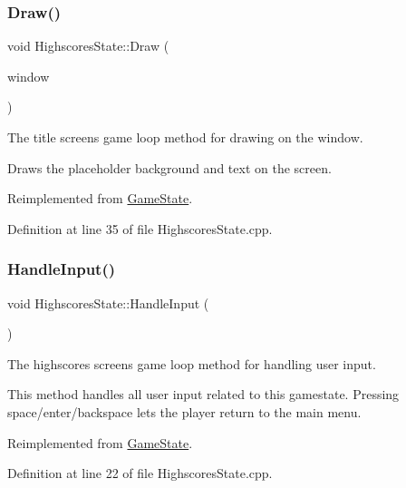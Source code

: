 \subsubsection{\texorpdfstring{Draw()}{Draw()}}
{\footnotesize\ttfamily void Highscores\+State\+::\+Draw (\begin{DoxyParamCaption}\item[{sf\+::\+Render\+Window \&}]{window }\end{DoxyParamCaption})\hspace{0.3cm}{\ttfamily [virtual]}}



The title screen\textquotesingle{}s game loop method for drawing on the window. 

Draws the placeholder background and text on the screen. 

Reimplemented from \hyperlink{class_game_state_a8741c5c696c6c366beb4b845c08c3cf8}{Game\+State}.



Definition at line 35 of file Highscores\+State.\+cpp.

\mbox{\label{class_highscores_state_aa8ce1b29acad9790ff065e5c96635c85}} 
\subsubsection{\texorpdfstring{Handle\+Input()}{HandleInput()}}
{\footnotesize\ttfamily void Highscores\+State\+::\+Handle\+Input (\begin{DoxyParamCaption}{ }\end{DoxyParamCaption})\hspace{0.3cm}{\ttfamily [virtual]}}



The highscores screen\textquotesingle{}s game loop method for handling user input. 

This method handles all user input related to this gamestate. Pressing space/enter/backspace lets the player return to the main menu. 

Reimplemented from \hyperlink{class_game_state_a8bce2828cee99ae7c07322804531fd01}{Game\+State}.



Definition at line 22 of file Highscores\+State.\+cpp.

\mbox{\label{class_highscores_state_a6368de23eaf55fa1cd40cba04cbd07a0}} 
